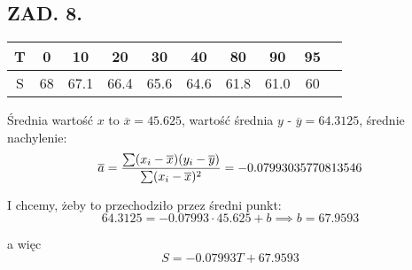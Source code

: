\documentclass{article}[16pt]
\begin{document}
\subsection*{ZAD. 8.}

\begin{center}
\begin{tabular}{c || c | c | c | c | c | c | c | c | c |}
    T & 0 & 10 & 20 & 30 & 40 & 80 & 90 & 95\\

    \hline

    S & 68 & 67.1 & 66.4 & 65.6 & 64.6 & 61.8 & 61.0 & 60
\end{tabular}
\end{center}

Średnia wartość $x$ to $\overline x=45.625$, wartość średnia $y$ - $\overline{y}=64.3125$, średnie nachylenie:
$$\overline{a}={\sum(x_i-\overline{x})(y_i-\overline{y})\over \sum(x_i-\overline{x})^2}=-0.07993035770813546$$

I chcemy, żeby to przechodziło przez średni punkt:
$$64.3125=-0.07993\cdot 45.625+b\implies b = 67.9593$$

a więc
$$S=-0.07993T+67.9593$$

\begin{center}
\end{center}
\end{document}
